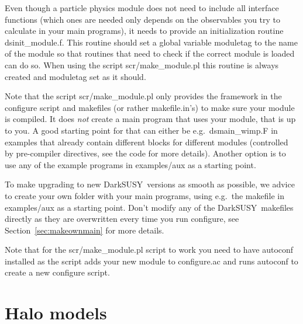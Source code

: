 \documentclass[a4paper,10pt,oneside]{book}
\newcommand{\code}[1]{\ft{#1}}
\newcommand{\ds}{{\sffamily DarkSUSY}}
\newcommand{\ft}[1]{\textsf{#1}}
\begin{document}
Even though a particle physics module does not need to include all interface functions (which ones 
are needed only depends on the observables you try to calculate in your main programs), it needs to provide 
an initialization routine 
\code{dsinit\_module.f}. This routine should set a global variable \code{moduletag} to the name of 
the module so that routines that need to check if the correct module is loaded can do so. When using the 
script \code{scr/make\_module.pl} this routine is always created and \code{moduletag} set as it should.


Note that the script \code{scr/make\_module.pl} only provides the framework in the configure script and makefiles (or rather makefile.in's) to make sure your module is compiled. It does \emph{not} create a main program that uses your module, that is up to you. A good starting point for that can either be e.g.\ \code{dsmain\_wimp.F} in examples that already contain different blocks for different modules (controlled by pre-compiler directives, see the code for more details). Another option is to use any of the example programs in \code{examples/aux} as a starting point. 

To make upgrading to new \ds\ versions as smooth as possible, we advice to create your own folder with your main programs, using e.g.\ the \code{makefile} in \code{examples/aux} as a starting point. Don't modify any of the \ds\ \code{makefile}s directly as they are overwritten every time you run \code{configure}, see Section~\ref{sec:makeownmain} for more details.

Note that for the \code{scr/make\_module.pl} script to work you need to have \code{autoconf} installed as the script adds your new module to \code{configure.ac} and runs \code{autoconf} to create a new \code{configure} script.

\section{Halo models}
\label{sec:halo_general}
\end{document}
